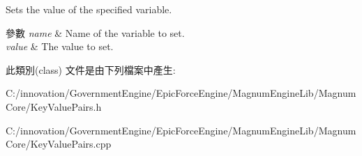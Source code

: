 Sets the value of the specified variable. 


\begin{DoxyParams}{參數}
{\em name} & Name of the variable to set. \\
\hline
{\em value} & The value to set. \\
\hline
\end{DoxyParams}


此類別(class) 文件是由下列檔案中產生\+:\begin{DoxyCompactItemize}
\item 
C\+:/innovation/\+Government\+Engine/\+Epic\+Force\+Engine/\+Magnum\+Engine\+Lib/\+Magnum\+Core/Key\+Value\+Pairs.\+h\item 
C\+:/innovation/\+Government\+Engine/\+Epic\+Force\+Engine/\+Magnum\+Engine\+Lib/\+Magnum\+Core/Key\+Value\+Pairs.\+cpp\end{DoxyCompactItemize}
